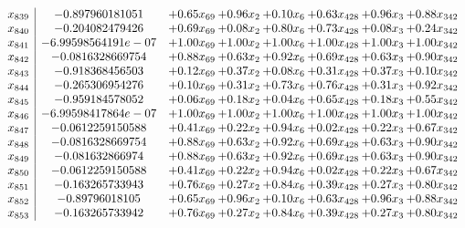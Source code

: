 \documentclass[8pt]{article}
\begin{document}
\[\begin{array}{c| c c@{\hskip 2pt} c@{\hskip 2pt} c@{\hskip 2pt} c@{\hskip 2pt} c@{\hskip 2pt} c@{\hskip 2pt} }
 x_{839}   &  -0.897960181051 & +  0.65 x_{69} & +  0.96 x_{2} & +  0.10 x_{6} & +  0.63 x_{428} & +  0.96 x_{3} & +  0.88 x_{342}\\
 x_{840}   &  -0.204082479426 & +  0.69 x_{69} & +  0.08 x_{2} & +  0.80 x_{6} & +  0.73 x_{428} & +  0.08 x_{3} & +  0.24 x_{342}\\
 x_{841}   &  -6.99598564191e-07 & +  1.00 x_{69} & +  1.00 x_{2} & +  1.00 x_{6} & +  1.00 x_{428} & +  1.00 x_{3} & +  1.00 x_{342}\\
 x_{842}   &  -0.0816328669754 & +  0.88 x_{69} & +  0.63 x_{2} & +  0.92 x_{6} & +  0.69 x_{428} & +  0.63 x_{3} & +  0.90 x_{342}\\
 x_{843}   &  -0.918368456503 & +  0.12 x_{69} & +  0.37 x_{2} & +  0.08 x_{6} & +  0.31 x_{428} & +  0.37 x_{3} & +  0.10 x_{342}\\
 x_{844}   &  -0.265306954276 & +  0.10 x_{69} & +  0.31 x_{2} & +  0.73 x_{6} & +  0.76 x_{428} & +  0.31 x_{3} & +  0.92 x_{342}\\
 x_{845}   &  -0.959184578052 & +  0.06 x_{69} & +  0.18 x_{2} & +  0.04 x_{6} & +  0.65 x_{428} & +  0.18 x_{3} & +  0.55 x_{342}\\
 x_{846}   &  -6.99598417864e-07 & +  1.00 x_{69} & +  1.00 x_{2} & +  1.00 x_{6} & +  1.00 x_{428} & +  1.00 x_{3} & +  1.00 x_{342}\\
 x_{847}   &  -0.0612259150588 & +  0.41 x_{69} & +  0.22 x_{2} & +  0.94 x_{6} & +  0.02 x_{428} & +  0.22 x_{3} & +  0.67 x_{342}\\
 x_{848}   &  -0.0816328669754 & +  0.88 x_{69} & +  0.63 x_{2} & +  0.92 x_{6} & +  0.69 x_{428} & +  0.63 x_{3} & +  0.90 x_{342}\\
 x_{849}   &  -0.081632866974 & +  0.88 x_{69} & +  0.63 x_{2} & +  0.92 x_{6} & +  0.69 x_{428} & +  0.63 x_{3} & +  0.90 x_{342}\\
 x_{850}   &  -0.0612259150588 & +  0.41 x_{69} & +  0.22 x_{2} & +  0.94 x_{6} & +  0.02 x_{428} & +  0.22 x_{3} & +  0.67 x_{342}\\
 x_{851}   &  -0.163265733943 & +  0.76 x_{69} & +  0.27 x_{2} & +  0.84 x_{6} & +  0.39 x_{428} & +  0.27 x_{3} & +  0.80 x_{342}\\
 x_{852}   &  -0.89796018105 & +  0.65 x_{69} & +  0.96 x_{2} & +  0.10 x_{6} & +  0.63 x_{428} & +  0.96 x_{3} & +  0.88 x_{342}\\
 x_{853}   &  -0.163265733942 & +  0.76 x_{69} & +  0.27 x_{2} & +  0.84 x_{6} & +  0.39 x_{428} & +  0.27 x_{3} & +  0.80 x_{342}\\

\end{array}\]
\end{document}
